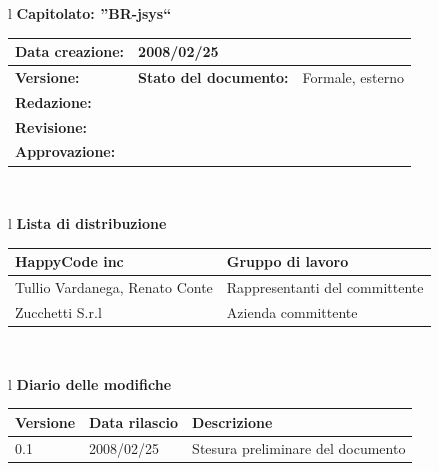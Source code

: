 \documentclass[11pt,titlepage,a4paper]{report}
\begin{document}
\begin{center}
\thispagestyle{plain}
\begin{table}[htbp]
\large{
\begin{tabular}{l}
\Large{\textbf{\textsf{Capitolato: ''BR-jsys``}}} \\
\begin{tabular}{||p{6cm}||p{6cm}||}
\hline
\textbf{Data creazione:} & 2008/02/25 \\ \hline
\textbf{Versione:} &  \hline
\textbf{Stato del documento:} & Formale, esterno \\ \hline
\textbf{Redazione:} & \\ \hline
\textbf{Revisione:} & \\ \hline
\textbf{Approvazione:} & \\ \hline
\end{tabular} \\
\end{tabular}
}
\end{table}

\begin{table}[hbtp]
\large{
\begin{tabular}{l}
\Large{\textbf{\textsf{Lista di distribuzione}}} \\

\begin{tabular}{||p{6cm}||p{6cm}||} \hline
{HappyCode inc}& Gruppo di lavoro\\ \hline
{Tullio Vardanega, Renato Conte}& Rappresentanti del committente \\ \hline
{Zucchetti S.r.l}& Azienda committente\\ \hline
\end{tabular} \\
\end{tabular}
}
\end{table}
\begin{table}[hbtp]
\large{
\begin{tabular}{l}
\Large{\textbf{\textsf{Diario delle modifiche}}} \\
\begin{tabular}{||p{2cm}||p{3.5cm}||p{6cm}||} \hline
\textbf{Versione} & \textbf{Data rilascio} & \textbf{Descrizione} \\ \hline
0.1 & 2008/02/25 & Stesura preliminare del documento \\ \hline

\end{tabular} \\
\end{tabular}

}
\end{table}
\end{center}
\newpage
\end{document}

